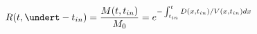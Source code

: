 \begin{equation}
R(t,\undert-t_{in}) = \frac{M(t,t_{in})}{M_0} = e^{-\int_{t_{in}}^t D(x,t_{in})/V(x,t_{in}) dx}
\end{equation}